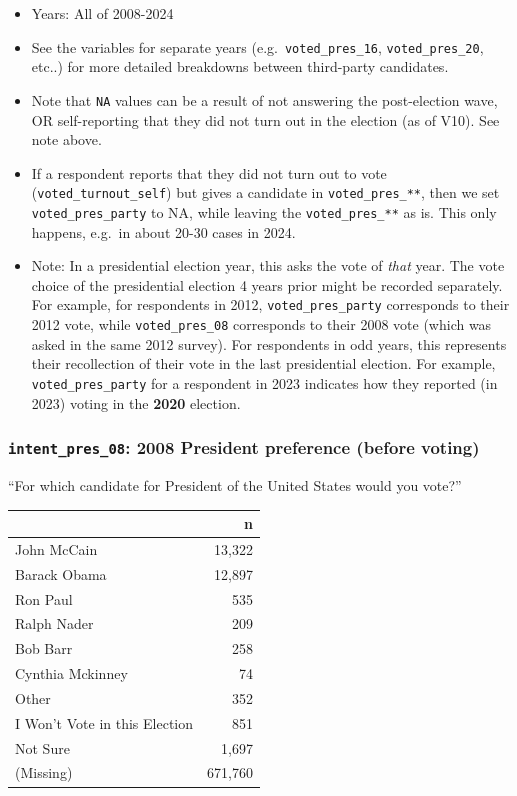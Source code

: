 \documentclass[10pt,article,oneside]{memoir}
\begin{document}
\begin{itemize}
\tightlist
\item
  Years: All of 2008-2024
\item
  See the variables for separate years (e.g.~\texttt{voted\_pres\_16},
  \texttt{voted\_pres\_20}, etc..) for more detailed breakdowns between
  third-party candidates.
\item
  Note that \texttt{NA} values can be a result of not answering the
  post-election wave, OR self-reporting that they did not turn out in
  the election (as of V10). See note above.
\item
  If a respondent reports that they did not turn out to vote
  (\texttt{voted\_turnout\_self}) but gives a candidate in
  \texttt{voted\_pres\_**}, then we set \texttt{voted\_pres\_party} to
  NA, while leaving the \texttt{voted\_pres\_**} as is. This only
  happens, e.g.~in about 20-30 cases in 2024.
\item
  Note: In a presidential election year, this asks the vote of
  \emph{that} year. The vote choice of the presidential election 4 years
  prior might be recorded separately. For example, for respondents in
  2012, \texttt{voted\_pres\_party} corresponds to their 2012 vote,
  while \texttt{voted\_pres\_08} corresponds to their 2008 vote (which
  was asked in the same 2012 survey). For respondents in odd years, this
  represents their recollection of their vote in the last presidential
  election. For example, \texttt{voted\_pres\_party} for a respondent in
  2023 indicates how they reported (in 2023) voting in the \textbf{2020}
  election.
\end{itemize}

\subsubsection{\texorpdfstring{\texttt{intent\_pres\_08}: 2008 President
preference (before
voting)}{intent\_pres\_08: 2008 President preference (before voting)}}\label{intent_pres_08-2008-president-preference-before-voting}

``For which candidate for President of the United States would you
vote?''

\begin{table}[H]
\centering
\begin{tabular}[t]{lr}
\toprule
 & n\\
\midrule
John McCain & 13,322\\
Barack Obama & 12,897\\
Ron Paul & 535\\
Ralph Nader & 209\\
Bob Barr & 258\\
Cynthia Mckinney & 74\\
Other & 352\\
I Won't Vote in this Election & 851\\
Not Sure & 1,697\\
(Missing) & 671,760\\
\bottomrule
\end{tabular}
\end{table}
\end{document}
